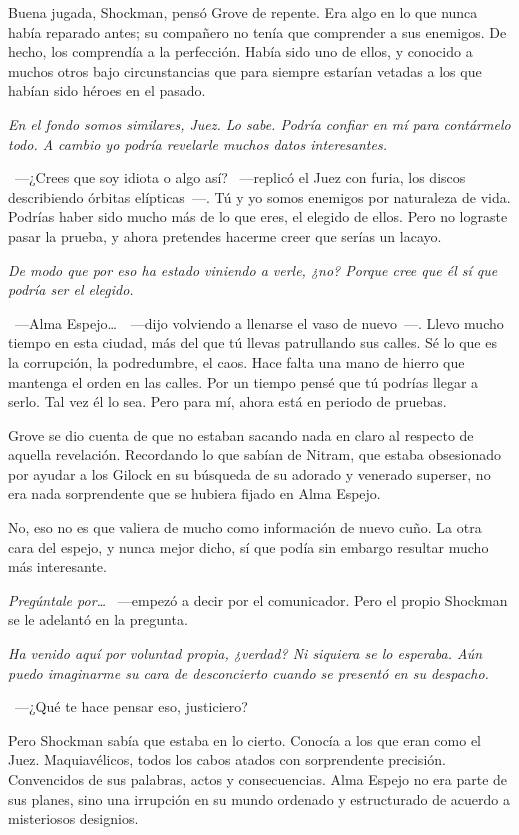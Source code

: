 Buena jugada, Shockman, pensó Grove de repente. Era algo en lo que nunca había reparado antes; su compañero no tenía que comprender a sus enemigos. De hecho, los comprendía a la perfección. Había sido uno de ellos, y conocido a muchos otros bajo circunstancias que para siempre estarían vetadas a los que habían sido héroes en el pasado.

\emph{En el fondo somos similares, Juez. Lo sabe. Podría confiar en mí para contármelo todo. A cambio yo podría revelarle muchos datos interesantes.}

~---¿Crees que soy idiota o algo así? ~---replicó el Juez con furia, los discos describiendo órbitas elípticas~---. Tú y yo somos enemigos por naturaleza de vida. Podrías haber sido mucho más de lo que eres, el elegido de ellos. Pero no lograste pasar la prueba, y ahora pretendes hacerme creer que serías un lacayo.

\emph{De modo que por eso ha estado viniendo a verle, ¿no? Porque cree que él sí que podría ser el elegido.}

~---Alma Espejo\dots\ ~---dijo volviendo a llenarse el vaso de nuevo~---. Llevo mucho tiempo en esta ciudad, más del que tú llevas patrullando sus calles. Sé lo que es la corrupción, la podredumbre, el caos. Hace falta una mano de hierro que mantenga el orden en las calles. Por un tiempo pensé que tú podrías llegar a serlo. Tal vez él lo sea. Pero para mí, ahora está en periodo de pruebas.

Grove se dio cuenta de que no estaban sacando nada en claro al respecto de aquella revelación. Recordando lo que sabían de Nitram, que estaba obsesionado por ayudar a los Gilock en su búsqueda de su adorado y venerado superser, no era nada sorprendente que se hubiera fijado en Alma Espejo.

No, eso no es que valiera de mucho como información de nuevo cuño. La otra cara del espejo, y nunca mejor dicho, sí que podía sin embargo resultar mucho más interesante.

\emph{Pregúntale por\dots} ~---empezó a decir por el comunicador. Pero el propio Shockman se le adelantó en la pregunta.

\emph{Ha venido aquí por voluntad propia, ¿verdad? Ni siquiera se lo esperaba. Aún puedo imaginarme su cara de desconcierto cuando se presentó en su despacho.}

~---¿Qué te hace pensar eso, justiciero?

Pero Shockman sabía que estaba en lo cierto. Conocía a los que eran como el Juez. Maquiavélicos, todos los cabos atados con sorprendente precisión. Convencidos de sus palabras, actos y consecuencias. Alma Espejo no era parte de sus planes, sino una irrupción en su mundo ordenado y estructurado de acuerdo a misteriosos designios.

